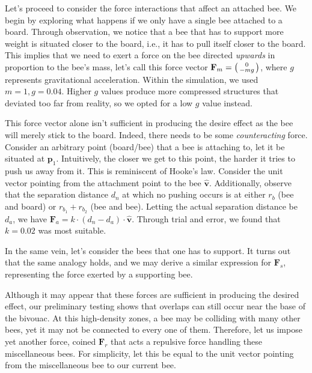 \documentclass[a4paper,10pt]{article}
\begin{document}
\begin{multicols}{2}
    Let's proceed to consider the force interactions that affect an attached bee. We begin by exploring
    what happens if we only have a single bee attached to a board. Through observation, we notice
    that a bee that has to support more weight is situated closer to the board, i.e., it has to pull
    itself closer to the board. This implies that we need to exert a force on the bee directed
    \textit{upwards} in proportion to the bee's mass, let's call this force vector
    $\mathbf{F}_{m} = \begin{psmallmatrix} 0 \\ -mg \end{psmallmatrix}$, where $g$
    represents gravitational acceleration. Within the simulation, we used $m = 1, g = 0.04$.
    Higher $g$ values produce more compressed structures that deviated too far from reality, so
    we opted for a low $g$ value instead.

    This force vector alone isn't sufficient in producing the desire effect as the bee will merely
    stick to the board. Indeed, there needs to be some \textit{counteracting} force. Consider
    an arbitrary point (board/bee) that a bee is attaching to, let it be situated at $\mathbf{p}_{1}$.
    Intuitively, the closer we get to this point, the harder it tries to push us away from it.
    This is reminiscent of Hooke's law. Consider the unit vector pointing from the attachment
    point to the bee $\hat{\mathbf{v}}$. Additionally, observe that the separation distance $d_{n}$ at which no
    pushing occurs is at either $r_{b}$ (bee and board) or $r_{b_{1}}+r_{b_{2}}$ (bee and bee).
    Letting the actual separation distance be $d_{a}$, we have
    $\mathbf{F}_{a} = k \cdot (d_{n}-d_{a}) \cdot \hat{\mathbf{v}}$. Through trial and error, we found that
    $k = 0.02$ was most suitable.

    In the same vein, let's consider the bees that one has to support. It turns out that the
    same analogy holds, and we may derive a similar expression for $\mathbf{F}_{s}$, representing
    the force exerted by a supporting bee.

    Although it may appear that these forces are sufficient
    in producing the desired effect, our preliminary testing shows that overlaps can still occur
    near the base of the bivouac. At this high-density zones, a bee may be colliding with many
    other bees, yet it may not be connected to every one of them. Therefore, let us impose yet
    another force, coined $\mathbf{F}_{r}$ that acts a repulsive force handling these miscellaneous
    bees. For simplicity, let this be equal to the unit vector pointing from the miscellaneous
    bee to our current bee.


\end{multicols}
\end{document}
